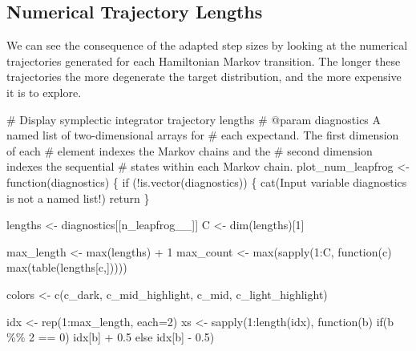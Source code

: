 \documentclass[
  letterpaper,
  DIV=11,
  numbers=noendperiod]{scrartcl}
\newenvironment{Shaded}{\begin{snugshade}}{\end{snugshade}}
\newcommand{\AttributeTok}[1]{\textcolor[rgb]{0.40,0.45,0.13}{#1}}
\newcommand{\CommentTok}[1]{\textcolor[rgb]{0.37,0.37,0.37}{#1}}
\newcommand{\ControlFlowTok}[1]{\textcolor[rgb]{0.00,0.23,0.31}{#1}}
\newcommand{\DecValTok}[1]{\textcolor[rgb]{0.68,0.00,0.00}{#1}}
\newcommand{\FloatTok}[1]{\textcolor[rgb]{0.68,0.00,0.00}{#1}}
\newcommand{\FunctionTok}[1]{\textcolor[rgb]{0.28,0.35,0.67}{#1}}
\newcommand{\NormalTok}[1]{\textcolor[rgb]{0.00,0.23,0.31}{#1}}
\newcommand{\OtherTok}[1]{\textcolor[rgb]{0.00,0.23,0.31}{#1}}
\newcommand{\SpecialCharTok}[1]{\textcolor[rgb]{0.37,0.37,0.37}{#1}}
\newcommand{\StringTok}[1]{\textcolor[rgb]{0.13,0.47,0.30}{#1}}
\begin{document}
\hypertarget{numerical-trajectory-lengths}{%
\subsection{Numerical Trajectory
Lengths}\label{numerical-trajectory-lengths}}

We can see the consequence of the adapted step sizes by looking at the
numerical trajectories generated for each Hamiltonian Markov transition.
The longer these trajectories the more degenerate the target
distribution, and the more expensive it is to explore.

\begin{Shaded}
\begin{Highlighting}[]
\CommentTok{\# Display symplectic integrator trajectory lengths}
\CommentTok{\# @param diagnostics A named list of two{-}dimensional arrays for }
\CommentTok{\#                    each expectand.  The first dimension of each}
\CommentTok{\#                    element indexes the Markov chains and the }
\CommentTok{\#                    second dimension indexes the sequential }
\CommentTok{\#                    states within each Markov chain.}
\NormalTok{plot\_num\_leapfrog }\OtherTok{\textless{}{-}} \ControlFlowTok{function}\NormalTok{(diagnostics) \{}
  \ControlFlowTok{if}\NormalTok{ (}\SpecialCharTok{!}\FunctionTok{is.vector}\NormalTok{(diagnostics)) \{}
    \FunctionTok{cat}\NormalTok{(}\StringTok{\textquotesingle{}Input variable \textasciigrave{}diagnostics\textasciigrave{} is not a named list!\textquotesingle{}}\NormalTok{)}
\NormalTok{    return}
\NormalTok{  \}}
  
\NormalTok{  lengths }\OtherTok{\textless{}{-}}\NormalTok{ diagnostics[[}\StringTok{\textquotesingle{}n\_leapfrog\_\_\textquotesingle{}}\NormalTok{]]}
\NormalTok{  C }\OtherTok{\textless{}{-}} \FunctionTok{dim}\NormalTok{(lengths)[}\DecValTok{1}\NormalTok{]}

\NormalTok{  max\_length }\OtherTok{\textless{}{-}} \FunctionTok{max}\NormalTok{(lengths) }\SpecialCharTok{+} \DecValTok{1}
\NormalTok{  max\_count }\OtherTok{\textless{}{-}} \FunctionTok{max}\NormalTok{(}\FunctionTok{sapply}\NormalTok{(}\DecValTok{1}\SpecialCharTok{:}\NormalTok{C, }\ControlFlowTok{function}\NormalTok{(c) }\FunctionTok{max}\NormalTok{(}\FunctionTok{table}\NormalTok{(lengths[c,]))))}

\NormalTok{  colors }\OtherTok{\textless{}{-}} \FunctionTok{c}\NormalTok{(c\_dark, c\_mid\_highlight, c\_mid, c\_light\_highlight)}

\NormalTok{  idx }\OtherTok{\textless{}{-}} \FunctionTok{rep}\NormalTok{(}\DecValTok{1}\SpecialCharTok{:}\NormalTok{max\_length, }\AttributeTok{each=}\DecValTok{2}\NormalTok{)}
\NormalTok{  xs }\OtherTok{\textless{}{-}} \FunctionTok{sapply}\NormalTok{(}\DecValTok{1}\SpecialCharTok{:}\FunctionTok{length}\NormalTok{(idx), }\ControlFlowTok{function}\NormalTok{(b) }\ControlFlowTok{if}\NormalTok{(b }\SpecialCharTok{\%\%} \DecValTok{2} \SpecialCharTok{==} \DecValTok{0}\NormalTok{) idx[b] }\SpecialCharTok{+} \FloatTok{0.5}
                                          \ControlFlowTok{else}\NormalTok{ idx[b] }\SpecialCharTok{{-}} \FloatTok{0.5}\NormalTok{)}


\end{Highlighting}
\end{Shaded}
\end{document}
